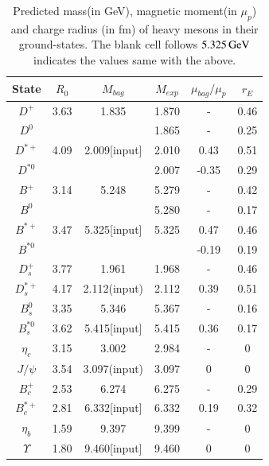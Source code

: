 \documentclass[prt,twocolumn,floatfix,nofootinbib]{revtex4}
\begin{document}
\renewcommand{\tabcolsep}{0.3cm}
\renewcommand{\arraystretch}{1.3}
\begin{table}[!htbp]
    \caption{Predicted mass(in GeV), magnetic moment(in $\mu_{p}$) and charge radius (in fm) of heavy mesons in their ground-states. The blank cell follows $5.325\,{\rm GeV}$ indicates the values same with the above.}
    \label{tab:heavymeson}
    \begin{tabular}{cccccc}
        \hline\hline
        {\rm State}             &$R_{0}$    &$M_{bag}$      &$M_{exp}$  &$\mu_{bag}/\mu_{p}$    &$r_{E}$ \\ \hline
        $D^{+}$ 	            &3.63	    &1.835	        &1.870	    &-                      &0.46 \\
        $D^{0}$ 			    &           &               &1.865	    &-                      &0.25 \\
        $D^{\ast +}$ 	        &4.09	    &2.009[input]  &2.010	    &0.43                   &0.51 \\
        $D^{\ast 0}$ 		    &           &               &2.007	    &-0.35                  &0.29 \\
        $B^{+}$ 	            &3.14	    &5.248	        &5.279	    &-                      &0.42 \\
        $B^{0}$ 			    &           &               &5.280	    &-                      &0.17 \\
        $B^{\ast +}$ 	        &3.47	    &5.325[input]  &5.325      &0.47                   &0.46 \\
        $B^{\ast 0}$ 		    &           &               &           &-0.19                  &0.19 \\
        $D_{s}^{+}$ 	        &3.77	    &1.961	        &1.968	    &-                      &0.46 \\
        $D_{s}^{\ast +}$ 	    &4.17	    &2.112(input)  &2.112	    &0.39                   &0.51 \\
        $B_{s}^{0}$ 	        &3.35	    &5.346	        &5.367	    &-                      &0.16 \\
        $B_{s}^{\ast 0}$ 	    &3.62	    &5.415[input]  &5.415	    &0.36                   &0.17 \\
        $\eta_{c}$ 	            &3.15	    &3.002	        &2.984	    &-                      &0 \\
        $J/\psi$ 	            &3.54	    &3.097(input)  &3.097	    &0                      &0 \\
        $B_{c}^{+}$ 	        &2.53	    &6.274	        &6.275	    &-                      &0.29 \\
        $B_{c}^{\ast +}$ 	    &2.81	    &6.332[input]  &6.332	    &0.19                   &0.32 \\
        $\eta_{b}$ 	            &1.59	    &9.397	        &9.399	    &-                      &0 \\
        $\Upsilon$ 	            &1.80	    &9.460[input]  &9.460	    &0                      &0 \\
        \hline\hline
    \end{tabular}
\end{table}
\end{document}
